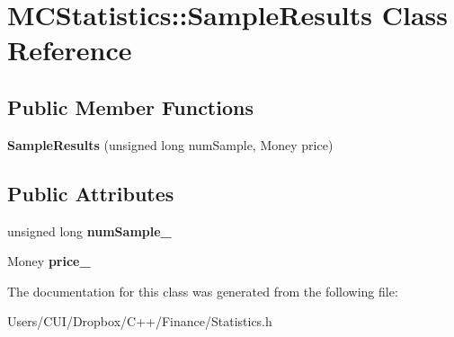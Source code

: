 \hypertarget{class_m_c_statistics_1_1_sample_results}{}\section{M\+C\+Statistics\+:\+:Sample\+Results Class Reference}
\label{class_m_c_statistics_1_1_sample_results}
\subsection*{Public Member Functions}
\begin{DoxyCompactItemize}
\item 
\hypertarget{class_m_c_statistics_1_1_sample_results_a49be18ef127e000d7f828ff69813abee}{}\label{class_m_c_statistics_1_1_sample_results_a49be18ef127e000d7f828ff69813abee} 
{\bfseries Sample\+Results} (unsigned long num\+Sample, Money price)
\end{DoxyCompactItemize}
\subsection*{Public Attributes}
\begin{DoxyCompactItemize}
\item 
\hypertarget{class_m_c_statistics_1_1_sample_results_a068edc7e162d279df3df01df775f431a}{}\label{class_m_c_statistics_1_1_sample_results_a068edc7e162d279df3df01df775f431a} 
unsigned long {\bfseries num\+Sample\+\_\+}
\item 
\hypertarget{class_m_c_statistics_1_1_sample_results_a942ac0f979f34804055ff0f5287516f1}{}\label{class_m_c_statistics_1_1_sample_results_a942ac0f979f34804055ff0f5287516f1} 
Money {\bfseries price\+\_\+}
\end{DoxyCompactItemize}


The documentation for this class was generated from the following file\+:\begin{DoxyCompactItemize}
\item 
Users/\+C\+U\+I/\+Dropbox/\+C++/\+Finance/Statistics.\+h\end{DoxyCompactItemize}

